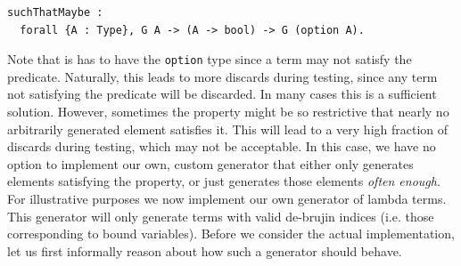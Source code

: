 \documentclass[twoside,11pt,openright]{report}
\newenvironment{code}{\captionsetup{type=figure, singlelinecheck=off, justification=raggedleft}}{}
\newcommand{\coq}[1]{\texttt{#1}}
\begin{document}
\begin{code}
\begin{verbatim}
suchThatMaybe :
  forall {A : Type}, G A -> (A -> bool) -> G (option A).
\end{verbatim}
\end{code}
Note that is has to have the \coq{option} type since a term may not satisfy the predicate. Naturally, this leads to more discards during testing, since any term not satisfying the predicate will be discarded. In many cases this is a sufficient solution. However, sometimes the property might be so restrictive that nearly no arbitrarily generated element satisfies it. This will lead to a very high fraction of discards during testing, which may not be acceptable. In this case, we have no option to implement our own, custom generator that either only generates elements satisfying the property, or just generates those elements \textit{often enough}. For illustrative purposes we now implement our own generator of lambda terms. This generator will only generate terms with valid de-brujin indices (i.e. those corresponding to bound variables). Before we consider the actual implementation, let us first informally reason about how such a generator should behave.
\end{document}
